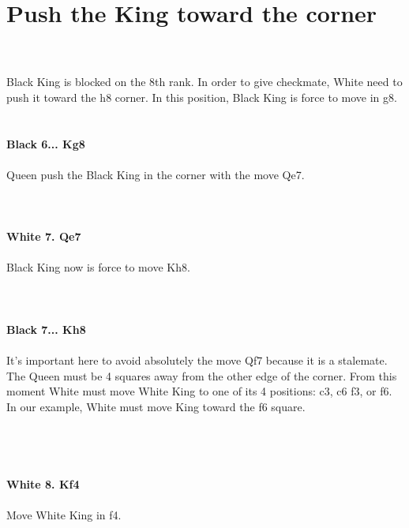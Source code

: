 \documentclass{article}
\begin{document}
\section{ Push the King toward the corner}

\\
\\
Black King is blocked on the 8th rank. In order to give checkmate, White need to push it toward the h8 corner. In this position, Black King is force to move in g8.\\

\\
\\
\textbf{Black 6... Kg8}\\
\\
Queen push the Black King in the corner with the move Qe7.\\
\\

\\
\\
\textbf{White 7. Qe7}\\
\\
Black King now is force to move Kh8.\\
\\

\\
\\
\textbf{Black 7... Kh8}\\
\\
It's important here to avoid absolutely the move Qf7 because it is a stalemate. The Queen must be 4 squares away from the other edge of the corner. From this moment White must move White King to one of its 4 positions: c3, c6 f3, or f6. In our example, White must move King toward the f6 square.\\\\
\\

\\
\\
\textbf{White 8. Kf4}\\
\\
Move White King in f4.\\\\
\\

\\
\end{document}
